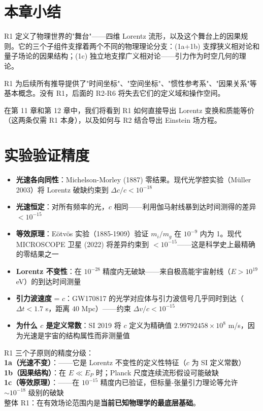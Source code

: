 \section{本章小结}

R1 定义了物理世界的"舞台"——四维 Lorentz 流形，以及这个舞台上的因果规则。它的三个子组件支撑着两个不同的物理理论分支：(1a+1b) 支撑狭义相对论和量子场论的因果结构；(1c) 独立地支撑广义相对论——引力作为时空几何的理论。

R1 为后续所有推导提供了"时间坐标"、"空间坐标"、"惯性参考系"、"因果关系"等基本概念。没有 R1，后面的 R2-R6 将失去它们的定义域和操作空间。

在第 11 章和第 12 章中，我们将看到 R1 如何直接导出 Lorentz 变换和质能等价（这两条仅需 R1 本身），以及如何与 R2 结合导出 Einstein 场方程。

\section*{实验验证精度}

\begin{oombox}
  \begin{itemize}
    \item \textbf{光速各向同性}：Michelson-Morley (1887) 零结果。现代光学腔实验（Müller 2003）将 Lorentz 破缺约束到 $\Delta c/c < 10^{-18}$
    \item \textbf{光速恒定}：对所有频率的光，$c$ 相同——利用伽马射线暴到达时间测得的差异 $< 10^{-15}$
    \item \textbf{等效原理}：Eötvös 实验（1885-1909）验证 $m_i/m_g$ 在 $10^{-9}$ 内为 1。现代 MICROSCOPE 卫星 (2022) 将差异约束到 $< 10^{-15}$——这是科学史上最精确的零结果之一
    \item \textbf{Lorentz 不变性}：在 $10^{-28}$ 精度内无破缺——来自极高能宇宙射线（$E > 10^{19}$ eV）的到达时间测量
    \item \textbf{引力波速度} = $c$：GW170817 的光学对应体与引力波信号几乎同时到达（$\Delta t < 1.7$ s，距离 $40$ Mpc）——约束 $\Delta v/c < 10^{-15}$
    \item \textbf{为什么 $c$ 是定义常数}：SI 2019 将 $c$ 定义为精确值 $2.99792458\times10^8$ m/s，因为光速是宇宙的结构属性而非测量值
  \end{itemize}
\end{oombox}

\precisionbox[R1 精度等级]
  R1 三个子原则的精度分级：\\
  \textbf{1a（光速不变）}：\precexact ——它是 Lorentz 不变性的定义性特征（$c$ 为 SI 定义常数）\\
  \textbf{1b（因果结构）}：\precexact 在 $E \ll E_P$ 时；Planck 尺度连续流形假设可能破缺\\
  \textbf{1c（等效原理）}：\preceffective ——在 $10^{-15}$ 精度内已验证，但标量-张量引力理论等允许 $\sim 10^{-18}$ 级别的破缺\\
  整体 R1：在有效场论范围内是\textbf{当前已知物理学的最底层基础}。
\endprecisionbox

